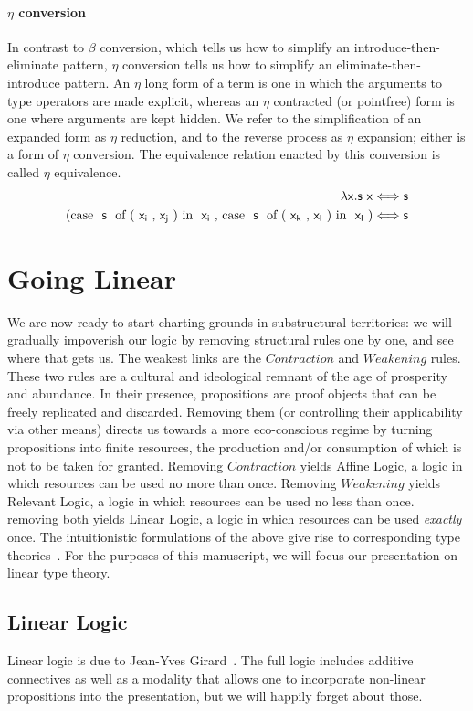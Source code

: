 \paragraph{$\eta$ conversion}
In contrast to $\beta$ conversion, which tells us how to simplify an introduce-then-eliminate pattern, $\eta$ conversion tells us how to simplify an eliminate-then-introduce pattern.
An $\eta$ long form of a term is one in which the arguments to type operators are made explicit, whereas an $\eta$ contracted (or pointfree) form is one where arguments are kept hidden.
We refer to the simplification of an expanded form as $\eta$ reduction, and to the reverse process as $\eta$ expansion; either is a form of $\eta$ conversion.
The equivalence relation enacted by this conversion is called $\eta$ equivalence.
\begin{align*}
	\term{\lambda x.s~x} & \Longleftrightarrow \term{s}\\
	\cterm{(case \term{s} of (\term{x_i},\term{x_j}) in \term{x_i}, case \term{s} of (\term{x_k},\term{x_l}) in \term{x_l})} & \Longleftrightarrow \term{s}
\end{align*}

\section{Going Linear}
We are now ready to start charting grounds in substructural territories: we will gradually impoverish our logic by removing structural rules one by one, and see where that gets us. 
The weakest links are the $Contraction$ and $Weakening$ rules.
These two rules are a cultural and ideological remnant of the age of prosperity and abundance.
In their presence, propositions are proof objects that can be freely replicated and discarded.
Removing them (or controlling their applicability via other means) directs us towards a more eco-conscious regime by turning propositions into finite resources, the production and/or consumption of which is not to be taken for granted.
Removing $Contraction$ yields Affine Logic, a logic in which resources can be used no more than once.
Removing $Weakening$ yields Relevant Logic, a logic in which resources can be used no less than once.
removing both yields Linear Logic, a logic in which resources can be used \textit{exactly} once.
The intuitionistic formulations of the above give rise to corresponding type theories~\cite{pierce2004advanced}.
For the purposes of this manuscript, we will focus our presentation on linear type theory.

\subsection{Linear Logic}
Linear logic is due to Jean-Yves Girard~\cite{girard1987linear}.
The full logic includes additive connectives as well as a modality that allows one to incorporate non-linear propositions into the presentation, but we will happily forget about those.

